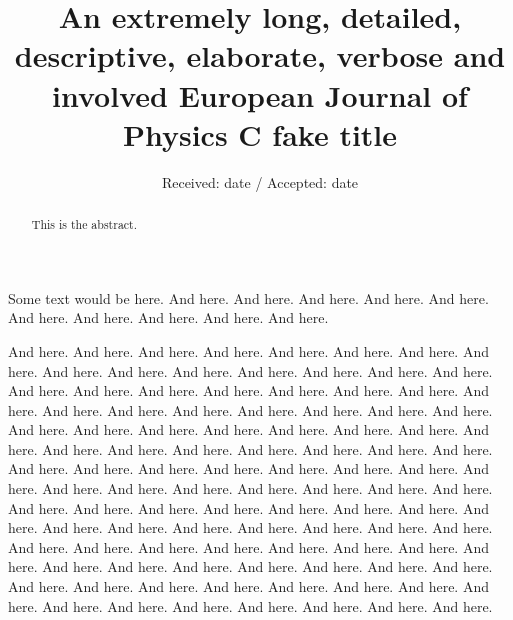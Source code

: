 \documentclass[pdftex,epjc3]{svjour3}          %
\begin{document}
\title{An extremely long, detailed, descriptive, elaborate, verbose and involved European Journal of Physics C fake title}



%
%

\date{Received: date / Accepted: date}

\maketitle

\begin{abstract} This is the abstract.
\end{abstract}

Some text would be here. And here. And here. And here. And here. And here. And here. And here. And here. And here. And here. 

And here. And here. And here. And here. And here. And here. And here. And here. And here. And here. And here. And here. And here. And here. And here. 
And here. And here. And here. And here. And here. And here. And here. And here. And here. And here. And here. And here. And here. And here. And here. 
And here. And here. And here. And here. And here. And here. And here. And here. And here. And here. And here. And here. And here. And here. And here. 
And here. And here. And here. And here. And here. And here. And here. And here. And here. And here. And here. And here. And here. And here. And here. 
And here. And here. And here. And here. And here. And here. And here. And here. And here. And here. And here. And here. And here. And here. And here. 
And here. And here. And here. And here. And here. And here. And here. And here. And here. And here. And here. And here. And here. And here. And here. 
And here. And here. And here. And here. And here. And here. And here. And here. And here. And here. And here. And here. And here. And here. And here. 
\end{document}
